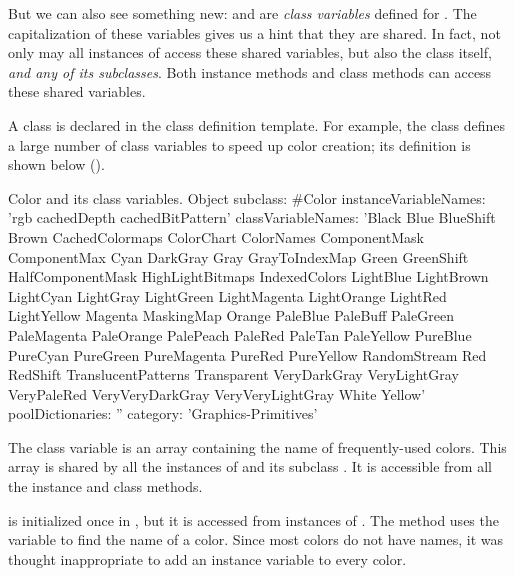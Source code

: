 \documentclass[a4paper,10pt,twoside]{book}
\begin{document}
But we can also see something new:  and  are \emph{class variables} defined for .
The capitalization of these variables gives us a hint that they are shared.
In fact, not only may all instances of  access these shared variables, but also the  class itself, \emph{and any of its subclasses}.
Both instance methods and class methods can access these shared variables.


A class  is declared in the class definition template.
For example, the class  defines a large number of class variables to speed up color creation; its definition is shown below ().

\begin{classdef}[Color]{Color and its class variables.}
Object subclass: #Color
        instanceVariableNames: 'rgb cachedDepth cachedBitPattern'
        classVariableNames: 'Black Blue BlueShift Brown CachedColormaps ColorChart ColorNames ComponentMask ComponentMax Cyan DarkGray Gray GrayToIndexMap Green GreenShift HalfComponentMask HighLightBitmaps IndexedColors LightBlue LightBrown LightCyan LightGray LightGreen LightMagenta LightOrange LightRed LightYellow Magenta MaskingMap Orange PaleBlue PaleBuff PaleGreen PaleMagenta PaleOrange PalePeach PaleRed PaleTan PaleYellow PureBlue PureCyan PureGreen PureMagenta PureRed PureYellow RandomStream Red RedShift TranslucentPatterns Transparent VeryDarkGray VeryLightGray VeryPaleRed VeryVeryDarkGray VeryVeryLightGray White Yellow'
        poolDictionaries: ''
        category: 'Graphics-Primitives'
\end{classdef}

The class variable  is an array containing the name of frequently-used colors.
This array is shared by all the instances of  and its subclass .
It is accessible from all the instance and class methods. %

 is initialized once in , but it is accessed from instances of .
The method  uses the variable to find the name of a color.
Since most colors do not have names, it was thought inappropriate to add an instance variable  to every color.
\end{document}
